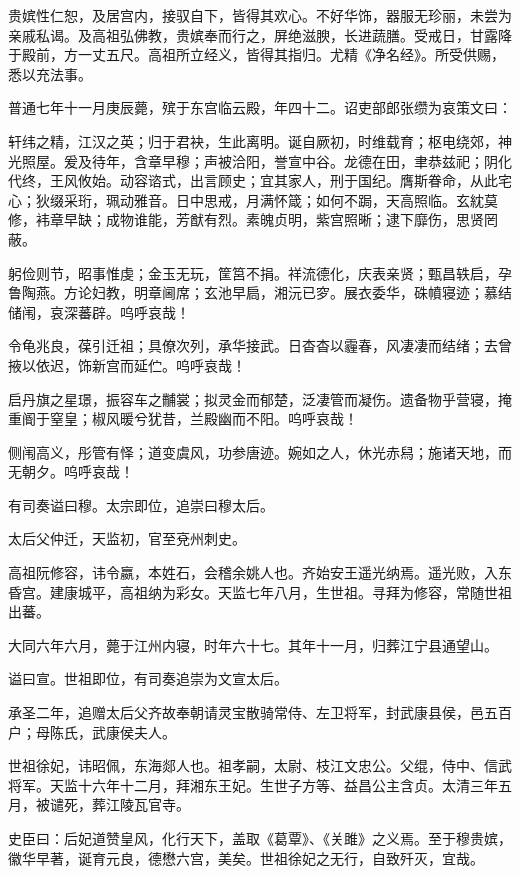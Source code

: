 \documentclass[12pt,UTF8]{ctexbook}
\begin{document}
贵嫔性仁恕，及居宫内，接驭自下，皆得其欢心。不好华饰，器服无珍丽，未尝为亲戚私谒。及高祖弘佛教，贵嫔奉而行之，屏绝滋腴，长进蔬膳。受戒日，甘露降于殿前，方一丈五尺。高祖所立经义，皆得其指归。尤精《净名经》。所受供赐，悉以充法事。

普通七年十一月庚辰薨，殡于东宫临云殿，年四十二。诏吏部郎张缵为哀策文曰：

轩纬之精，江汉之英；归于君袂，生此离明。诞自厥初，时维载育；枢电绕郊，神光照屋。爰及待年，含章早穆；声被洽阳，誉宣中谷。龙德在田，聿恭兹祀；阴化代终，王风攸始。动容谘式，出言顾史；宜其家人，刑于国纪。膺斯眷命，从此宅心；狄缀采珩，珮动雅音。日中思戒，月满怀箴；如何不跼，天高照临。玄紞莫修，袆章早缺；成物谁能，芳猷有烈。素魄贞明，紫宫照晰；逮下靡伤，思贤罔蔽。

躬俭则节，昭事惟虔；金玉无玩，筐筥不捐。祥流德化，庆表亲贤；甄昌轶启，孕鲁陶燕。方论妇教，明章阃席；玄池早扃，湘沅已穸。展衣委华，硃幩寝迹；慕结储闱，哀深蕃辟。呜呼哀哉！

令龟兆良，葆引迁祖；具僚次列，承华接武。日杳杳以霾春，风凄凄而结绪；去曾掖以依迟，饰新宫而延伫。呜呼哀哉！

启丹旗之星璟，振容车之黼裳；拟灵金而郁楚，泛凄管而凝伤。遗备物乎营寝，掩重阍于窒皇；椒风暖兮犹昔，兰殿幽而不阳。呜呼哀哉！

侧闱高义，彤管有怿；道变虞风，功参唐迹。婉如之人，休光赤舄；施诸天地，而无朝夕。呜呼哀哉！

有司奏谥曰穆。太宗即位，追崇曰穆太后。

太后父仲迁，天监初，官至兗州刺史。

高祖阮修容，讳令嬴，本姓石，会稽余姚人也。齐始安王遥光纳焉。遥光败，入东昏宫。建康城平，高祖纳为彩女。天监七年八月，生世祖。寻拜为修容，常随世祖出蕃。

大同六年六月，薨于江州内寝，时年六十七。其年十一月，归葬江宁县通望山。

谥曰宣。世祖即位，有司奏追崇为文宣太后。

承圣二年，追赠太后父齐故奉朝请灵宝散骑常侍、左卫将军，封武康县侯，邑五百户；母陈氏，武康侯夫人。

世祖徐妃，讳昭佩，东海郯人也。祖孝嗣，太尉、枝江文忠公。父绲，侍中、信武将军。天监十六年十二月，拜湘东王妃。生世子方等、益昌公主含贞。太清三年五月，被谴死，葬江陵瓦官寺。

史臣曰：后妃道赞皇风，化行天下，盖取《葛覃》、《关雎》之义焉。至于穆贵嫔，徽华早著，诞育元良，德懋六宫，美矣。世祖徐妃之无行，自致歼灭，宜哉。
\end{document}
